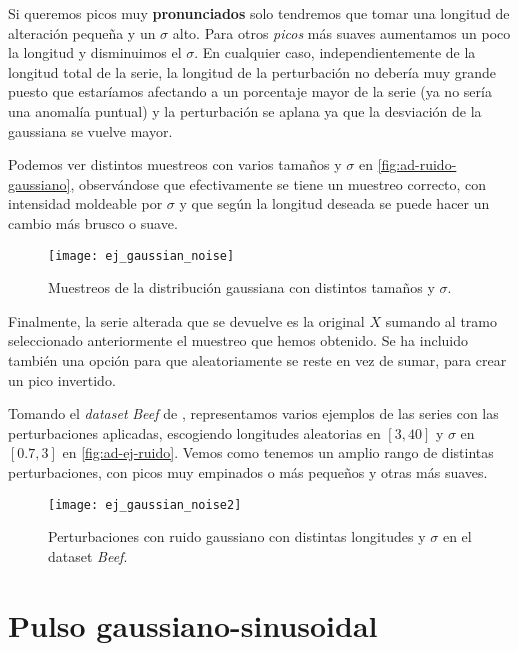 Si queremos picos muy \textbf{pronunciados} solo tendremos que tomar una longitud de alteración pequeña y un $\sigma$ alto. Para otros \emph{picos} más suaves aumentamos un poco la longitud y disminuimos el $\sigma$. En cualquier caso, independientemente de la longitud total de la serie, la longitud de la perturbación no debería muy grande puesto que estaríamos afectando a un porcentaje mayor de la serie (ya no sería una anomalía puntual) y la perturbación se aplana ya que la desviación de la gaussiana se vuelve mayor.

Podemos ver distintos muestreos con varios tamaños y $\sigma$ en \autoref{fig:ad-ruido-gaussiano}, observándose que efectivamente se tiene un muestreo correcto, con intensidad moldeable por $\sigma$ y que según la longitud deseada se puede hacer un cambio más brusco o suave.

\begin{figure}[htpb]
  \centering
  \texttt{[image: ej\_gaussian\_noise]}
  \caption{Muestreos de la distribución gaussiana con distintos tamaños y $\sigma$.}
  \label{fig:ad-ruido-gaussiano}
\end{figure}

Finalmente, la serie alterada que se devuelve es la original $X$ sumando al tramo seleccionado anteriormente el muestreo que hemos obtenido. Se ha incluido también una opción para que aleatoriamente se reste en vez de sumar, para crear un pico invertido.

Tomando el \emph{dataset} \emph{Beef} de \cite{bagnall2020ts}, representamos varios ejemplos de las series con las perturbaciones aplicadas, escogiendo longitudes aleatorias en $[3, 40]$ y $\sigma$ en $[0.7, 3]$ en \autoref{fig:ad-ej-ruido}. Vemos como tenemos un amplio rango de distintas perturbaciones, con picos muy empinados o más pequeños y otras más suaves.

\begin{figure}[htpb]
  \centering
  \texttt{[image: ej\_gaussian\_noise2]}
  \caption{Perturbaciones con ruido gaussiano con distintas longitudes y $\sigma$ en el dataset \emph{Beef}.}
  \label{fig:ad-ej-ruido}
\end{figure}

\section{Pulso gaussiano-sinusoidal}


